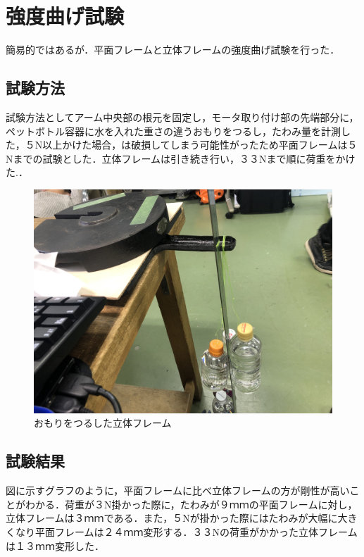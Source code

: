 \chapter{強度曲げ試験}
簡易的ではあるが．平面フレームと立体フレームの強度曲げ試験を行った．

\section{試験方法}
試験方法としてアーム中央部の根元を固定し，モータ取り付け部の先端部分に，ペットボトル容器に水を入れた重さの違うおもりをつるし，たわみ量を計測した，５N以上かけた場合，は破損してしまう可能性がったため平面フレームは５Nまでの試験とした．立体フレームは引き続き行い，３３Nまで順に荷重をかけた.．

\begin{figure}[htbp]
  \begin{center}
    \includegraphics[width=120mm]{img/２３.JPG}
    \end{center}
  \caption{おもりをつるした立体フレーム}
 \label{fig:robot}
\end{figure}

\section{試験結果}
図に示すグラフのように，平面フレームに比べ立体フレームの方が剛性が高いことがわかる．荷重が３N掛かった際に，たわみが９ｍｍの平面フレームに対し，立体フレームは３ｍｍである．また，５Nが掛かった際にはたわみが大幅に大きくなり平面フレームは２４ｍｍ変形する．３３Nの荷重がかかった立体フレームは１３ｍｍ変形した．

